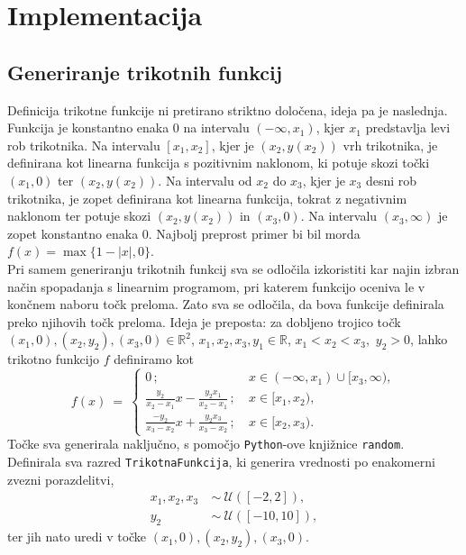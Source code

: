 \documentclass[11pt]{article}
\theoremstyle{definition}
\newcommand{\R}{\mathbb{R}}
\newcommand{\1}{\mathbbm{1}}
\newcommand{\set}[1]{\{#1\}}
\begin{document}
\section{Implementacija}
\vspace{0.5cm}


\subsection{Generiranje trikotnih funkcij}
\vspace{0.5cm}

Definicija trikotne funkcije ni pretirano striktno določena, ideja pa je naslednja. 
Funkcija je konstantno enaka $0$ na intervalu $(-\infty, x_1)$, kjer $x_1$ predstavlja levi rob trikotnika. 
Na intervalu $[x_1, x_2]$, kjer je $(x_2,y(x_2))$ vrh trikotnika, je definirana kot linearna funkcija s pozitivnim naklonom, ki potuje skozi točki $(x_1,0)$ ter $(x_2,y(x_2))$. 
Na intervalu od $x_2$ do $x_3$, kjer je $x_3$ desni rob trikotnika, je zopet definirana kot linearna funkcija, tokrat z negativnim naklonom ter potuje skozi $(x_2,y(x_2))$ in $(x_3,0)$. 
Na intervalu $(x_3,\infty)$ je zopet konstantno enaka $0$. Najbolj preprost primer bi bil morda $f(x) = \max\set{1-|x|,0}$. \\

Pri samem generiranju trikotnih funkcij sva se odločila izkoristiti kar najin izbran način spopadanja s linearnim programom, pri katerem funkcijo oceniva le v končnem naboru točk preloma. Zato sva se odločila, da bova funkcije definirala preko njihovih točk preloma. Ideja je preposta: za dobljeno trojico točk $(x_1, 0),(x_2, y_2),(x_3,0) \in \R^2$, $x_1,x_2,x_3,y_1 \in \R$, \hbox{$x_1<x_2<x_3$, $y_2>0$,} lahko trikotno funkcijo $f$ definiramo kot
$$f(x) ~=~ \begin{cases}
0\,; ~&x \in (-\infty,x_1)\cup[x_3,\infty), \\
\frac{y_2}{x_2-x_1}x - \frac{y_2x_1}{x_2-x_1}\,; ~& x \in [x_1,x_2), \\
\frac{-y_2}{x_3-x_2}x + \frac{y_2x_3}{x_3-x_2}\,; ~& x \in [x_2, x_3).
\end{cases}$$
Točke sva generirala naključno, s pomočjo \texttt{Python}-ove knjižnice \texttt{random}. Definirala sva razred \texttt{TrikotnaFunkcija}, ki generira vrednosti po enakomerni zvezni porazdelitvi, 
\begin{align*}
x_1,x_2,x_3 ~&\sim~ \mathcal{U}([-2,2]), \\
y_2 ~&\sim~ \mathcal{U}([-10,10]), 
\end{align*}
ter jih nato uredi v točke $(x_1,0),(x_2,y_2),(x_3,0)$.
\end{document}
